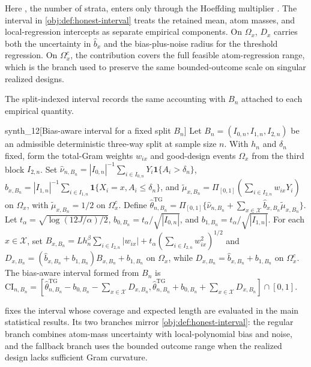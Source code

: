 \documentclass[11pt]{article}
\begin{document}
Here , the number of strata, enters only through the Hoeffding multiplier . The interval  in \cref{obj:def:honest-interval} treats the retained mean, atom masses, and local-regression intercepts as separate empirical components. On \(\Omega_x\), \(D_x\) carries both the uncertainty in \(\widehat b_x\) and the bias-plus-noise radius for the threshold regression. On \(\Omega_x^c\), the contribution covers the full feasible atom-regression range, which is the branch used to preserve the same bounded-outcome scale on singular realized designs.

The split-indexed interval records the same accounting with \(B_n\) attached to each empirical quantity.

\begin{definitionv}{synth_12}[Bias-aware interval for a fixed split $B_n$]
Let $B_n=(I_{0,n},I_{1,n},I_{2,n})$ be an admissible deterministic three-way split at sample size $n$. With $h_n$ and $\delta_n$ fixed, form the total-Gram weights $w_{ix}$ and good-design events $\Omega_x$ from the third block $I_{2,n}$. Set $\widehat\nu_{n,B_n}=|I_{0,n}|^{-1}\sum_{i\in I_{0,n}}Y_i\mathbf 1\{A_i>\delta_n\}$, $\widehat b_{x,B_n}=|I_{1,n}|^{-1}\sum_{i\in I_{1,n}}\mathbf 1\{X_i=x,A_i\leq\delta_n\}$, and $\widetilde\mu_{x,B_n}=\Pi_{[0,1]}(\sum_{i\in I_{2,n}}w_{ix}Y_i)$ on $\Omega_x$, with $\widetilde\mu_{x,B_n}=1/2$ on $\Omega_x^c$. Define $\widehat\theta^{\mathrm{TG}}_{n,B_n}=\Pi_{[0,1]}\{\widehat\nu_{n,B_n}+\sum_{x\in\mathcal X}\widehat b_{x,B_n}\widetilde\mu_{x,B_n}\}$. Let $t_\alpha=\sqrt{\log(12J/\alpha)/2}$, $b_{0,B_n}=t_\alpha/\sqrt{|I_{0,n}|}$, and $b_{1,B_n}=t_\alpha/\sqrt{|I_{1,n}|}$. For each $x\in\mathcal X$, set $B_{x,B_n}=Lh_n^\beta\sum_{i\in I_{2,n}}|w_{ix}|+t_\alpha(\sum_{i\in I_{2,n}}w_{ix}^2)^{1/2}$ and $D_{x,B_n}=(\widehat b_{x,B_n}+b_{1,B_n})B_{x,B_n}+b_{1,B_n}$ on $\Omega_x$, while $D_{x,B_n}=\widehat b_{x,B_n}+b_{1,B_n}$ on $\Omega_x^c$. The bias-aware interval formed from $B_n$ is $\mathrm{CI}_{n,B_n}=[\widehat\theta^{\mathrm{TG}}_{n,B_n}-b_{0,B_n}-\sum_{x\in\mathcal X}D_{x,B_n},\widehat\theta^{\mathrm{TG}}_{n,B_n}+b_{0,B_n}+\sum_{x\in\mathcal X}D_{x,B_n}]\cap[0,1]$.
\end{definitionv}

 fixes the interval whose coverage and expected length are evaluated in the main statistical results. Its two branches mirror \cref{obj:def:honest-interval}: the regular branch combines atom-mass uncertainty with local-polynomial bias and noise, and the fallback branch uses the bounded outcome range when the realized design lacks sufficient Gram curvature.
\end{document}
